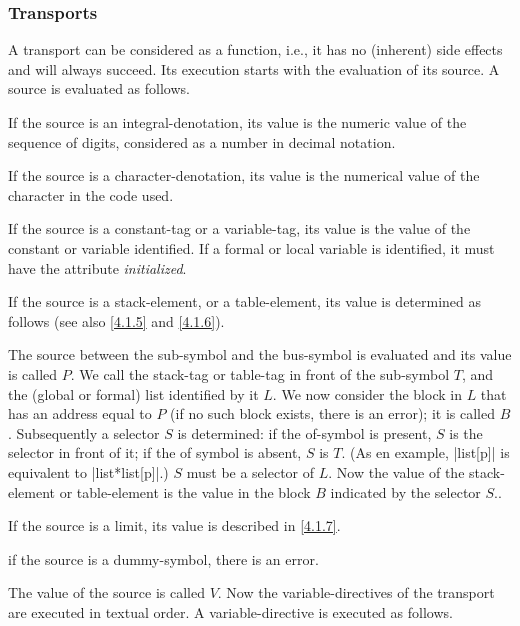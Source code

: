 \documentclass{article}
\newcommand\g[1]{{\sf #1}}
\let\oref\ref
\let\ref\oref
\begin{document}
\subsubsection{Transports}\label{3.4.1}
A \g{transport} can be considered as a \g{function}, i.e., it has no
(inherent) side effects and will always succeed.
Its execution starts with the evaluation of its \g{source}.
A \g{source} is evaluated as follows.
\begin{trivlist}
\item
If the \g{source} is an \g{integral-denotation}, its value is the numeric
value of the sequence of \g{digit}s, considered as a number in decimal
notation.
\item
If the \g{source} is a \g{character-denotation}, its value is the numerical
value of the \g{character} in the code used.
\item
If the \g{source} is a \g{constant-tag} or a \g{variable-tag}, its value is
the value of the constant or variable identified. If a
formal or local variable is identified, it must have the attribute \emph{initialized}.
\item
If the \g{source} is a \g{stack-element}, or a \g{table-element}, its value is determined as follows (see
also \ref{4.1.5} and \ref{4.1.6}).

The \g{source} between the \g{sub-symbol} and the
\g{bus-symbol} is evaluated and its value is called $P$. We call the
\g{stack-tag} or \g{table-tag} in front of the \g{sub-symbol} $T$, and the
(global or formal) list identified by it $L$.
We now consider the block in $L$ that has an address
equal to $P$ (if no such block exists, there is an error); it is called $B$.
Subsequently a selector $S$ is determined: if the \g{of-symbol} is present,
$S$ is the
\g{selector} in front of it; if the \g{of symbol} is absent, $S$ is $T$.
(As en example, \pp|list[p]| is equivalent to \pp|list*list[p]|.) $S$ must
be a selector of $L$.
Now the value of the
\g{stack-element} or \g{table-element} is the value in the block $B$ indicated by the selector
$S$..
\item
If the \g{source} is a \g{limit}, its value is described in \ref{4.1.7}.
\item if the \g{source} is a \g{dummy-symbol}, there is an error.
\end{trivlist}

The value of the \g{source} is called $V$. Now the 
\g{variable-directive}s of the \g{transport} are executed in textual order. 
A \g{variable-directive} is executed as follows.
\end{document}
